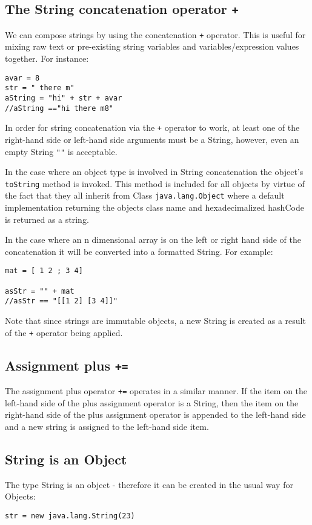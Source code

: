 \documentclass[conc-doc]{subfiles}
\begin{document}
\subsection{The String concatenation operator \lstinline!+!}
\label{subsec:StringConcat}
We can compose strings by using the concatenation \lstinline{+} operator. This is useful for mixing raw text or pre-existing string variables and variables/expression values together. For instance:

\begin{lstlisting}
avar = 8
str = " there m"
aString = "hi" + str + avar
//aString =="hi there m8"
\end{lstlisting}

In order for string concatenation via the \lstinline{+} operator to work, at least one of the right-hand side or left-hand side arguments must be a String, however, even an empty String \lstinline{""} is acceptable.

In the case where an object type is involved in String concatenation the object's \lstinline{toString} method is invoked. This method is included for all objects by virtue of the fact that they all inherit from Class \lstinline{java.lang.Object} where a default implementation returning the objects class name and hexadecimalized hashCode is returned as a string.

In the case where an n dimensional array is on the left or right hand side of the concatenation it will be converted into a formatted String. For example:
\begin{lstlisting}
mat = [ 1 2 ; 3 4]

asStr = "" + mat
//asStr == "[[1 2] [3 4]]"
\end{lstlisting}

Note that since strings are immutable objects, a new String is created as a result of the \lstinline{+} operator being applied.

\subsection{Assignment plus \lstinline!+=!}
The assignment plus operator \lstinline{+=} operates in a similar manner. If the item on the left-hand side of the plus assignment operator is a String, then the item on the right-hand side of the plus assignment operator is appended to the left-hand side and a new string is assigned to the left-hand side item. 

\subsection{String is an Object}
The type String is an object - therefore it can be created in the usual way for Objects:
\begin{lstlisting}
str = new java.lang.String(23)
\end{lstlisting}
\end{document}
